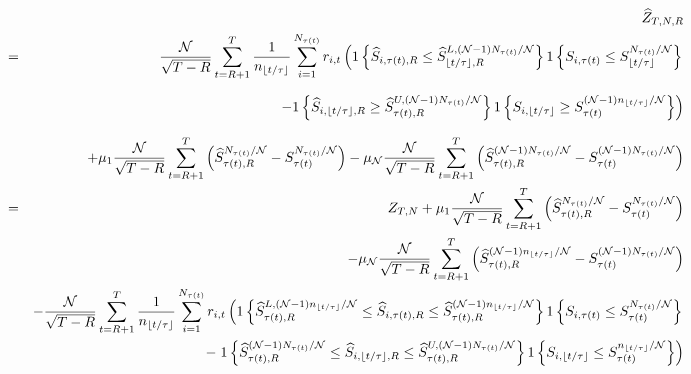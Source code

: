 \begin{eqnarray}
&&\widehat{Z}_{T,N,R}  \notag \\
&=&\frac{\mathcal{N}}{\sqrt{T-R}}\sum_{t=R+1}^{T}\frac{1}{n_{\lfloor t/\tau
\rfloor }}\sum_{i=1}^{N_{\tau(t)}}r_{i,t}\left( 1\left\{ 
\widehat{S}_{i,\tau(t),R}\leq \widehat{S}_{\lfloor t/\tau
\rfloor ,R}^{L,(\mathcal{N}-1)N_{\tau(t)}/\mathcal{N}%
}\right\} 1\left\{ S_{i,\tau(t)}\leq S_{\lfloor t/\tau
\rfloor }^{N_{\tau(t)}/\mathcal{N}}\right\} \right.   \notag
\\
&&\phantom{+\frac{\mathcal{N}}{\sqrt{T-R}}\sum_{t=R+1}^{T}\frac{1}{n_{%
\tau(t)}}\sum_{i=1}^{n_{\lfloor t/\tau \rfloor
}}r_{i,t}\left( \right.}\left. -1\left\{ \widehat{S}_{i,\lfloor t/\tau
\rfloor ,R}\geq \widehat{S}_{\tau(t),R}^{U,(\mathcal{N}%
-1)N_{\tau(t)}/\mathcal{N}}\right\} 1\left\{ S_{i,\lfloor
t/\tau \rfloor }\geq S_{\tau(t)}^{(\mathcal{N}-1)n_{\lfloor
t/\tau \rfloor }/\mathcal{N}}\right\} \right)   \notag \\
&&+\mu _{1}\frac{\mathcal{N}}{\sqrt{T-R}}\sum_{t=R+1}^{T}\left( \widehat{S}%
_{\tau(t),R}^{N_{\tau(t)}/\mathcal{N}%
}-S_{\tau(t)}^{N_{\tau(t)}/\mathcal{N}%
}\right) -\mu _{\mathcal{N}}\frac{\mathcal{N}}{\sqrt{T-R}}%
\sum_{t=R+1}^{T}\left( \widehat{S}_{\tau(t),R}^{(\mathcal{N}%
-1)N_{\tau(t)}/\mathcal{N}}-S_{\tau(t)}^{(%
\mathcal{N}-1)N_{\tau(t)}/\mathcal{N}}\right)   \notag \\
&=&Z_{T,N}+\mu _{1}\frac{\mathcal{N}}{\sqrt{T-R}}\sum_{t=R+1}^{T}\left( 
\widehat{S}_{\tau(t),R}^{N_{\tau(t)}/%
\mathcal{N}}-S_{\tau(t)}^{N_{\tau(t)}/%
\mathcal{N}}\right)   \notag \\
&&-\mu _{\mathcal{N}}\frac{\mathcal{N}}{\sqrt{T-R}}\sum_{t=R+1}^{T}\left( 
\widehat{S}_{\tau(t),R}^{(\mathcal{N}-1)n_{\lfloor t/\tau
\rfloor }/\mathcal{N}}-S_{\tau(t)}^{(\mathcal{N}%
-1)N_{\tau(t)}/\mathcal{N}}\right)   \notag \\
&&-\frac{\mathcal{N}}{\sqrt{T-R}}\sum_{t=R+1}^{T}\frac{1}{n_{\lfloor t/\tau
\rfloor }}\sum_{i=1}^{N_{\tau(t)}}r_{i,t}\left( 1\left\{ 
\widehat{S}_{\tau(t),R}^{L,(\mathcal{N}-1)n_{\lfloor t/\tau
\rfloor }/\mathcal{N}}\leq \widehat{S}_{i,\tau(t),R}\leq 
\widehat{S}_{\tau(t),R}^{(\mathcal{N}-1)n_{\lfloor t/\tau
\rfloor }/\mathcal{N}}\right\} 1\left\{ S_{i,\tau(t)}\leq
S_{\tau(t)}^{N_{\tau(t)}/\mathcal{N}%
}\right\} \right.   \notag \\
&&-\left. 1\left\{ \widehat{S}_{\tau(t),R}^{(\mathcal{N}%
-1)N_{\tau(t)}/\mathcal{N}}\leq \widehat{S}_{i,\lfloor
t/\tau \rfloor ,R}\leq \widehat{S}_{\tau(t),R}^{U,(\mathcal{N%
}-1)N_{\tau(t)}/\mathcal{N}}\right\} 1\left\{ S_{i,\lfloor
t/\tau \rfloor }\leq S_{\tau(t)}^{n_{\lfloor t/\tau \rfloor
}/\mathcal{N}}\right\} \right)   \label{Z}
\end{eqnarray}

